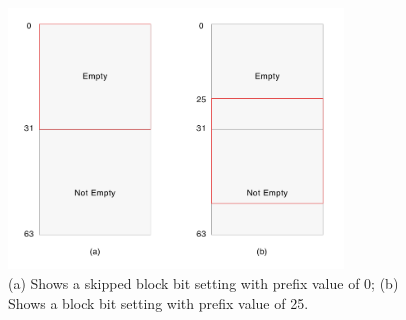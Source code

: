 \begin{figure}[h]
	\centering
	\includegraphics[width=3.5in]{contents/00_images/block-skip}\vspace*{5pt}
	\caption{(a) Shows a skipped block bit setting with prefix value of 0; (b) Shows a block bit setting with prefix value of 25.}
	\label{fig:boolean-block-skip}
\end{figure}